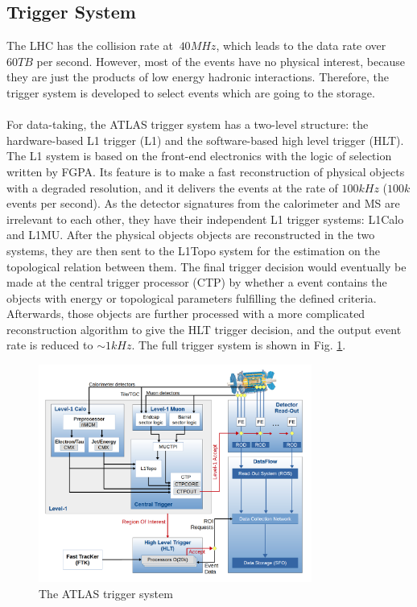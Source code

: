 \subsection{Trigger System}
The LHC has the collision rate at $~40MHz$, which leads to the data rate over $60TB$ per second. However, most of the events have no physical interest, because they are just the products of low energy hadronic interactions. Therefore, the trigger system is developed to select events which are going to the storage.
\\
\\For data-taking, the ATLAS trigger system has a two-level structure: the hardware-based L1 trigger (L1) and the software-based high level trigger (HLT). The L1 system is based on the front-end electronics with the logic of selection written by FGPA. Its feature is to make a fast reconstruction of physical objects with a degraded resolution, and it delivers the events at the rate of $100kHz$ ($100k$ events per second). As the detector signatures from the calorimeter and MS are irrelevant to each other, they have their independent L1 trigger systems: L1Calo and L1MU. After the physical objects objects are reconstructed in the two systems, they are then sent to the L1Topo system for the estimation on the topological relation between them. The final trigger decision would eventually be made at the central trigger processor (CTP) by whether a event contains the objects with energy or topological parameters fulfilling the defined criteria. Afterwards, those objects are further processed with a more complicated reconstruction algorithm to give the HLT trigger decision, and the output event rate is reduced to $\sim 1kHz$. The full trigger system is shown in Fig. \ref{Fig:trigger}.
\begin{figure}[!h]                
	\includegraphics[width=0.8\textwidth]{Chapter2/Trigger.png}
	\centering
	\begin{center}
		\caption{The ATLAS trigger system}
		\label{Fig:trigger}            
	\end{center}
\end{figure}
